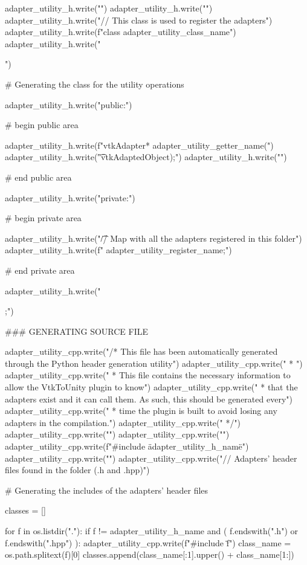 \begin{appendices}
\begin{python}[label=lst:generateheader,caption={generate-header.py script},aboveskip=20pt]
adapter_utility_h.write("\n")
adapter_utility_h.write("\n")
adapter_utility_h.write("// This class is used to register the adapters\n")
adapter_utility_h.write(f"class {adapter_utility_class_name}\n")
adapter_utility_h.write("{\n")

# Generating the class for the utility operations

adapter_utility_h.write("public:\n")

# begin public area

adapter_utility_h.write(f"\tstatic vtkAdapter* {adapter_utility_getter_name}(\n")
adapter_utility_h.write("\t\tLPCSTR vtkAdaptedObject);\n")
adapter_utility_h.write("\n")

# end public area

adapter_utility_h.write("private:\n")

# begin private area

adapter_utility_h.write("\t// Map with all the adapters registered in this folder\n")
adapter_utility_h.write(f" {adapter_utility_register_name};\n")

# end private area

adapter_utility_h.write("};\n")



### GENERATING SOURCE FILE

adapter_utility_cpp.write("/* This file has been automatically generated through the Python header generation utility\n")
adapter_utility_cpp.write(" * \n")
adapter_utility_cpp.write(" * This file contains the necessary information to allow the VtkToUnity plugin to know\n")
adapter_utility_cpp.write(" * that the adapters exist and it can call them. As such, this should be generated every\n")
adapter_utility_cpp.write(" * time the plugin is built to avoid losing any adapters in the compilation.\n")
adapter_utility_cpp.write(" */\n")
adapter_utility_cpp.write("\n")
adapter_utility_cpp.write("\n")
adapter_utility_cpp.write(f"#include \"{adapter_utility_h_name}\"\n")
adapter_utility_cpp.write("\n")
adapter_utility_cpp.write("// Adapters' header files found in the folder (.h and .hpp)\n")

# Generating the includes of the adapters' header files

classes = []

for f in os.listdir("."):
    if f != adapter_utility_h_name and ( f.endswith(".h") or f.endswith(".hpp") ):
        adapter_utility_cpp.write(f"#include \"{f}\"\n")
        class_name = os.path.splitext(f)[0]
        classes.append(class_name[:1].upper() + class_name[1:])


\end{python}
\end{appendices}
